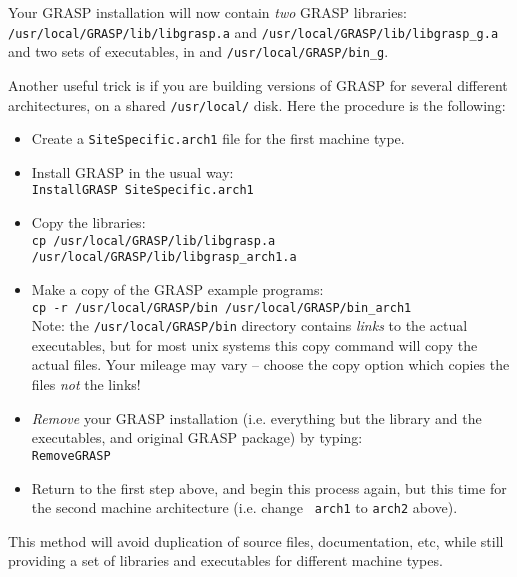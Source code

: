 Your GRASP installation will now contain {\it two} GRASP libraries:
{\tt /usr/local/GRASP/lib/libgrasp.a} and 
{\tt /usr/local/GRASP/lib/libgrasp\_g.a} and two sets of
executables, in 
 and 
{\tt /usr/local/GRASP/bin\_g}.

Another useful trick is if you are building versions of GRASP for
several different architectures, on a shared {\tt /usr/local/} disk.
Here the procedure is the following:
\begin{itemize}
\item
Create a {\tt SiteSpecific.arch1} file for the first machine
type.
\item
Install GRASP in the usual way:\\
{\tt InstallGRASP SiteSpecific.arch1}
\item
Copy the libraries:\\
{\tt cp /usr/local/GRASP/lib/libgrasp.a
/usr/local/GRASP/lib/libgrasp\_arch1.a}
\item
Make a copy of the GRASP example programs:\\
{\tt cp -r /usr/local/GRASP/bin /usr/local/GRASP/bin\_arch1}\\
Note: the {\tt /usr/local/GRASP/bin} directory contains {\it links}
to the actual executables, but for most unix systems this copy command
will copy the actual files.  Your mileage may vary -- choose the copy
option
which copies the files {\it not} the links!
\item
{\it Remove} your GRASP installation (i.e. everything but the
library and the executables, and original GRASP package) by typing:\\
{\tt RemoveGRASP}
\item
Return to the first step above, and begin this process again, but this
time for the second machine architecture (i.e. change {\tt
arch1} to {\tt arch2} above).
\end{itemize}
This method will avoid duplication of source files, documentation,
etc, while still providing a set of libraries and executables for
different machine types.

